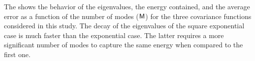 The  shows the behavior of the eigenvalues, the energy contained, and the average error as a function of the number of modes ($\textsf{M}$) for the three covariance functions considered in this study.
The decay of the eigenvalues of the square exponential case is much faster than the exponential case. The latter requires a more significant number of modes to capture the same energy when compared to the first one.
\begin{figure}[H]
 \centering

\end{figure}
